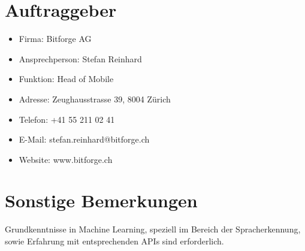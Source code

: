 \documentclass[11pt,a4paper]{article}
\begin{document}
\section*{Auftraggeber}
\begin{itemize}
    \item Firma: Bitforge AG
    \item Ansprechperson: Stefan Reinhard
    \item Funktion: Head of Mobile
    \item Adresse: Zeughausstrasse 39, 8004 Zürich
    \item Telefon: +41 55 211 02 41
    \item E-Mail: stefan.reinhard@bitforge.ch
    \item Website: www.bitforge.ch
\end{itemize}



\section*{Sonstige Bemerkungen}
Grundkenntnisse in Machine Learning, speziell im Bereich der Spracherkennung, sowie
Erfahrung mit entsprechenden APIs sind erforderlich.
\end{document}
